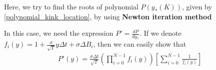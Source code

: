 \documentclass[11pt]{article}
\begin{document}
 Here, we try to  find the roots of polynomial $P(y_{\ast}(K))$, given by \eqref{polynomial_kink_location}, by using \textbf{Newton iteration method}
 
 In this case, we need the expression $P'=\frac{d P}{d y_\ast}$. If we denote $f_i(y)=1+\frac{\sigma}{\sqrt{T}} y \Delta t+ \sigma \Delta B_{i}$, then we can easily show that
 \begin{align}\label{polynomial_kink_location_derivative}
 	P'(y)=\frac{\sigma \Delta t}{\sqrt{T}} \left( \prod_{i=0}^{N-1} f_i(y)\right) \left[ \sum_{i=0}^{N-1} \frac{1}{f_i(y)}\right]
 \end{align}
\end{document}
